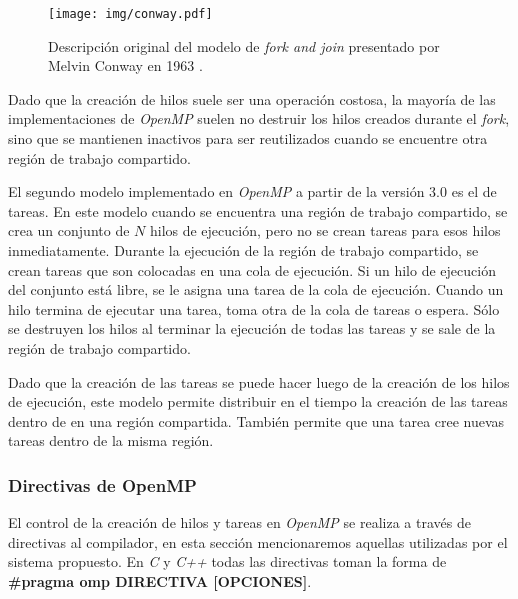 \begin{figure}[!htb]

	\centering

	\texttt{[image: img/conway.pdf]}

	\caption{Descripción original del modelo de \emph{fork and join}
	presentado por Melvin Conway en 1963 \cite{conway1963}.}

	\label{conway}

\end{figure}

Dado que la creación de hilos suele ser una operación costosa, la mayoría de las
implementaciones de \emph{OpenMP} suelen no destruir los hilos creados durante
el \emph{fork}, sino que se mantienen inactivos para ser reutilizados cuando se
encuentre otra región de trabajo compartido.

El segundo modelo implementado en \emph{OpenMP} a partir de la versión 3.0 es
el de tareas. En este modelo cuando se encuentra una región de trabajo
compartido, se crea un conjunto de $N$ hilos de ejecución, pero no se crean
tareas para esos hilos inmediatamente. Durante la ejecución de la región de
trabajo compartido, se crean tareas que son colocadas en una cola de ejecución.
Si un hilo de ejecución del conjunto está libre, se le asigna una tarea de la
cola de ejecución. Cuando un hilo termina de ejecutar una tarea, toma otra de la
cola de tareas o espera. Sólo se destruyen los hilos al terminar la ejecución de
todas las tareas y se sale de la región de trabajo compartido.

Dado que la creación de las tareas se puede hacer luego de la creación de los
hilos de ejecución, este modelo permite distribuir en el tiempo la creación de
las tareas dentro de en una región compartida. También permite que una tarea
cree nuevas tareas dentro de la misma región.

\subsubsection{Directivas de OpenMP}

El control de la creación de hilos y tareas en \emph{OpenMP} se realiza a través
de directivas al compilador, en esta sección mencionaremos aquellas utilizadas
por el sistema propuesto. En \emph{C} y \emph{C++} todas las directivas toman la
forma de \textbf{\#pragma omp DIRECTIVA [OPCIONES]}.

